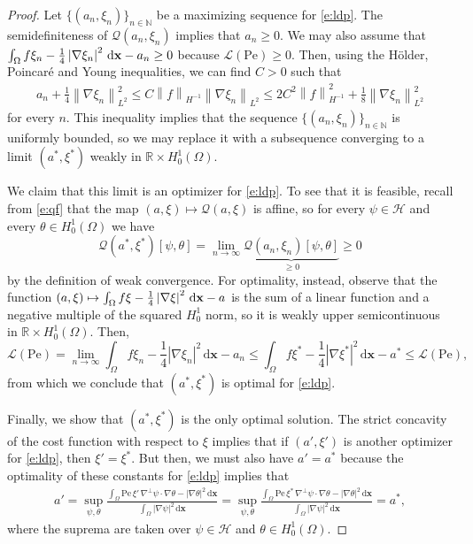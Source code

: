 \documentclass[a4paper, 10pt]{amsart}
\numberwithin{equation}{section}
\theoremstyle{plain}
\theoremstyle{definition}
\theoremstyle{remark}
\newcommand{\cal}[1]{\mathcal{#1}}
\newcommand{\R}{\mathbb{R}}
\newcommand{\N}{\mathbb{N}}
\newcommand{\Pe}{\mathrm{Pe}}
\newcommand{\Hmo}{H^{-1}}
\newcommand{\Hoz}{H_0^1(\Omega)}
\newcommand{\QF}{\mathcal{Q}}
\newcommand{\cost}[2]{\avg{f#1 - \frac14 \abs{\nabla #1}^2} - #2}
\renewcommand{\vec}[1]{\mathbf{#1}}
\newcommand{\abs}[1]{\left\vert #1 \right\vert}
\newcommand{\dx}{\mathrm{d} \vec{x}}
\newcommand{\avg}[1]{\int_\Omega #1 \,\dx}
\newcommand{\norm}[1]{\left\| #1 \right\|}
\newcommand{\lb}{\mathcal{L}}
\begin{document}
\begin{proof}
    Let $\{(a_n,\xi_n)\}_{n\in\N}$ be a maximizing sequence for \cref{e:ldp}. The semidefiniteness of $\QF(a_n,\xi_n)$ implies that $a_n\geq 0$. We may also assume that $\smash{\cost{\xi_n}{a_n}} \geq 0$ because $\lb(\Pe)\geq 0$. Then, using the H\"older, Poincar\'e and Young inequalities, we can find $C>0$ such that
    \begin{align}\label{e:boundedness}
        a_n + \frac14\norm{\nabla \xi_n}_{L^2}^2 
        \leq C \norm{f}_{\Hmo} \norm{\nabla \xi_n}_{L^2} 
        \leq 2C^2\norm{f}_{\Hmo}^2 + \frac18\norm{\nabla \xi_n}_{L^2}^2
    \end{align}
    for every $n$. This inequality implies that the sequence $\{(a_n,\xi_n)\}_{n\in\N}$ is uniformly bounded, so we may replace it with a subsequence converging to a limit $(a^*,\xi^*)$ weakly in $\R \times H^1_0(\Omega)$. 
    
    We claim that this limit is an optimizer for \cref{e:ldp}. To see that it is feasible, recall from \cref{e:qf} that the map $(a,\xi)\mapsto \QF(a,\xi)$ is affine, so for every $\psi\in\cal{H}$ and every $\theta \in H^1_0(\Omega)$ we have
    \begin{equation*}
        \QF(a^*,\xi^*)[\psi,\theta] = \lim_{n\to\infty}  \underbrace{\QF(a_n,\xi_n)[\psi,\theta]}_{\geq 0} \geq 0
    \end{equation*}
    by the definition of weak convergence.
    For optimality, instead, observe that the function $(a,\xi)\mapsto \smash{\cost{\xi}{a}}$ is the sum of a linear function and a negative multiple of the squared $H^1_0$ norm, so it is weakly upper semicontinuous in $\R \times H^1_0(\Omega)$. Then,
    \begin{equation*}
        \lb(\Pe) = \lim_{n\to\infty} \cost{\xi_n}{a_n} \leq \cost{\xi^*}{a^*} \leq \lb(\Pe),
    \end{equation*}
    from which we conclude that $(a^*,\xi^*)$ is optimal for \cref{e:ldp}.

    Finally, we show that $(a^*,\xi^*)$ is the only optimal solution. The strict concavity of the cost function with respect to $\xi$ implies that if $(a',\xi')$ is another optimizer for \cref{e:ldp}, then $\xi'=\xi^*$. But then, we must also have $a'=a^*$ because the optimality of these constants for \cref{e:ldp} implies that
    \begin{align*}
        a' 
        = 
        \sup_{\psi,\theta}
        \frac{\avg{\Pe\,\xi'\,\nabla^\perp\psi\cdot\nabla\theta - \abs{\nabla\theta}^2}}{\avg{\abs{\nabla \psi}^2}}
        =
        \sup_{\psi,\theta}
        \frac{\avg{\Pe\,\xi^*\,\nabla^\perp\psi\cdot\nabla\theta - \abs{\nabla\theta}^2}}{\avg{\abs{\nabla \psi}^2}}
        = a^*,
    \end{align*}
    where the suprema are taken over $\psi \in \cal{H}$ and $\theta \in \Hoz$. 
\end{proof}
\end{document}
